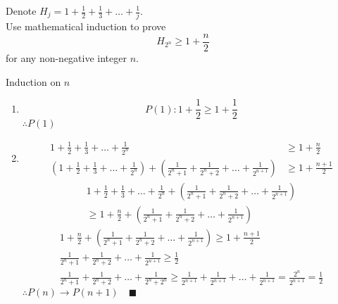 \documentclass[letterpaper, 12pt]{article}
\newenvironment{proof}[1][Proof]{\begin{trivlist}
\item[\hskip \labelsep {\bfseries #1}]}{\end{trivlist}}
\newenvironment{example}[1][Example]{\begin{trivlist}
\item[\hskip \labelsep {\bfseries #1}]}{\end{trivlist}}
\newcommand{\qed}{\quad \blacksquare}
\newcommand{\then}{\rightarrow}
\newcommand{\0}{\emptyset}
\begin{document}
    \begin{example}
        Denote $H_j = 1 + \frac{1}{2} + \frac{1}{3} + \dots + \frac{1}{j}$. \\
        Use mathematical induction to prove 
        \[H_{2^n} \ge 1 + \frac{n}{2}\]
        for any non-negative integer $n$.
    \end{example}
    \begin{proof} Induction on $n$
        \begin{enumerate}
            \item \[
                P(1): 1 + \frac{1}{2} \ge 1 + \frac{1}{2}
            \]
            $\therefore P(1)$
            \item \begin{align*}
                1 + \frac{1}{2} + \frac{1}{3} + \dots + \frac{1}{2^n} &\ge 1 + \frac{n}{2} \\
                (1 + \frac{1}{2} + \frac{1}{3} + \dots + \frac{1}{2^n}) 
                + (\frac{1}{2^n + 1} + \frac{1}{2^n + 2} + \dots + \frac{1}{2^{n+1}}) 
                &\ge 1 + \frac{n + 1}{2}
            \end{align*}
            \begin{multline*}
                1 + \frac{1}{2} + \frac{1}{3} + \dots + \frac{1}{2^n} 
                + (\frac{1}{2^n + 1} + \frac{1}{2^n + 2} + \dots + \frac{1}{2^{n+1}}) \\
                \ge 1 + \frac{n}{2} 
                + (\frac{1}{2^n + 1} + \frac{1}{2^n + 2} + \dots + \frac{1}{2^{n+1}}) 
            \end{multline*}
            \begin{align*}
                1 + \frac{n}{2} 
                + (\frac{1}{2^n + 1} + \frac{1}{2^n + 2} + \dots + \frac{1}{2^{n+1}}) 
                \ge 1 + \frac{n + 1}{2} \\
                \frac{1}{2^n + 1} + \frac{1}{2^n + 2} + \dots + \frac{1}{2^{n+1}} 
                \ge \frac{1}{2} \\
                \frac{1}{2^n + 1} + \frac{1}{2^n + 2} + \dots + \frac{1}{2^n + 2^n} 
                \ge \frac{1}{2^{n+1}} + \frac{1}{2^{n+1}} + \dots + \frac{1}{2^{n+1}}
                = \frac{2^n}{2^{n+1}} = \frac{1}{2}
            \end{align*}
            $\therefore P(n) \then P(n+1) \qed$
        \end{enumerate}
    \end{proof}
\end{document}

